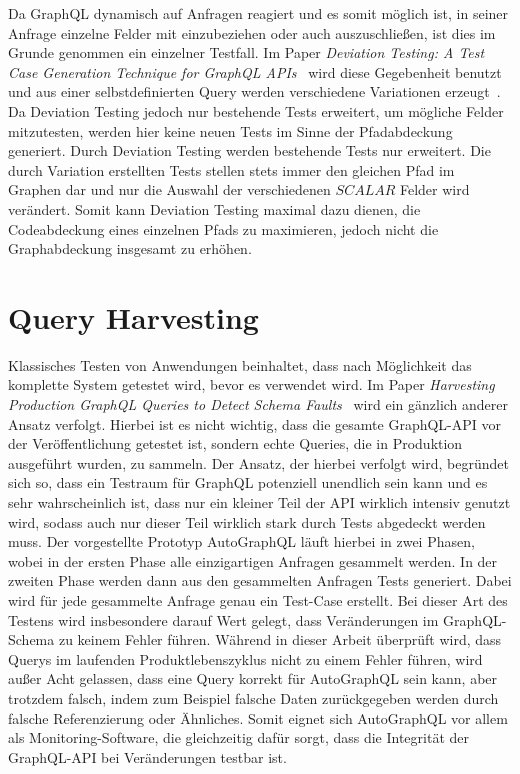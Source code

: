 Da GraphQL dynamisch auf Anfragen reagiert und es somit möglich ist, in seiner Anfrage einzelne Felder mit einzubeziehen
oder auch auszuschließen, ist dies im Grunde genommen ein einzelner Testfall.
Im Paper \textit{Deviation Testing: A Test Case Generation Technique for GraphQL APIs}~\cite{deviation} wird diese Gegebenheit benutzt und
aus einer selbstdefinierten Query werden verschiedene Variationen erzeugt~\cite[vgl. 3]{deviation}.
Da Deviation Testing jedoch nur bestehende Tests erweitert, um mögliche Felder mitzutesten, werden hier keine neuen Tests  im Sinne der Pfadabdeckung generiert.
Durch Deviation Testing werden bestehende Tests nur erweitert.
Die durch Variation erstellten Tests stellen stets immer den gleichen Pfad im Graphen dar und nur die Auswahl der verschiedenen $SCALAR$ Felder wird verändert.
Somit kann Deviation Testing maximal dazu dienen, die Codeabdeckung eines einzelnen Pfads zu maximieren, jedoch nicht die Graphabdeckung insgesamt zu erhöhen.

\section{Query Harvesting}

Klassisches Testen von Anwendungen beinhaltet, dass nach Möglichkeit das komplette System getestet wird, bevor es verwendet wird.
Im Paper \textit{Harvesting Production GraphQL Queries to Detect Schema Faults}~\cite{harvesting} wird ein gänzlich anderer Ansatz verfolgt.
Hierbei ist es nicht wichtig, dass die gesamte GraphQL-API vor der Veröffentlichung getestet ist, sondern echte Queries, die in Produktion ausgeführt wurden, zu sammeln.
Der Ansatz, der hierbei verfolgt wird, begründet sich so, dass ein Testraum für GraphQL potenziell unendlich sein kann und es sehr wahrscheinlich ist, dass nur ein kleiner
Teil der API wirklich intensiv genutzt wird, sodass auch nur dieser Teil wirklich stark durch Tests abgedeckt werden muss.
Der vorgestellte Prototyp AutoGraphQL läuft hierbei in zwei Phasen, wobei in der ersten Phase alle einzigartigen Anfragen gesammelt werden.
In der zweiten Phase werden dann aus den gesammelten Anfragen Tests generiert.
Dabei wird für jede gesammelte Anfrage genau ein Test-Case erstellt.
Bei dieser Art des Testens wird insbesondere darauf Wert gelegt, dass Veränderungen im GraphQL-Schema zu keinem Fehler führen.
Während in dieser Arbeit überprüft wird, dass Querys im laufenden Produktlebenszyklus nicht zu einem Fehler führen, wird außer Acht gelassen,
dass eine Query korrekt für AutoGraphQL sein kann, aber trotzdem falsch, indem zum Beispiel falsche Daten zurückgegeben werden
durch falsche Referenzierung oder Ähnliches.
Somit eignet sich AutoGraphQL vor allem als Monitoring-Software, die gleichzeitig dafür sorgt, dass die Integrität der GraphQL-API bei Veränderungen
testbar ist.

